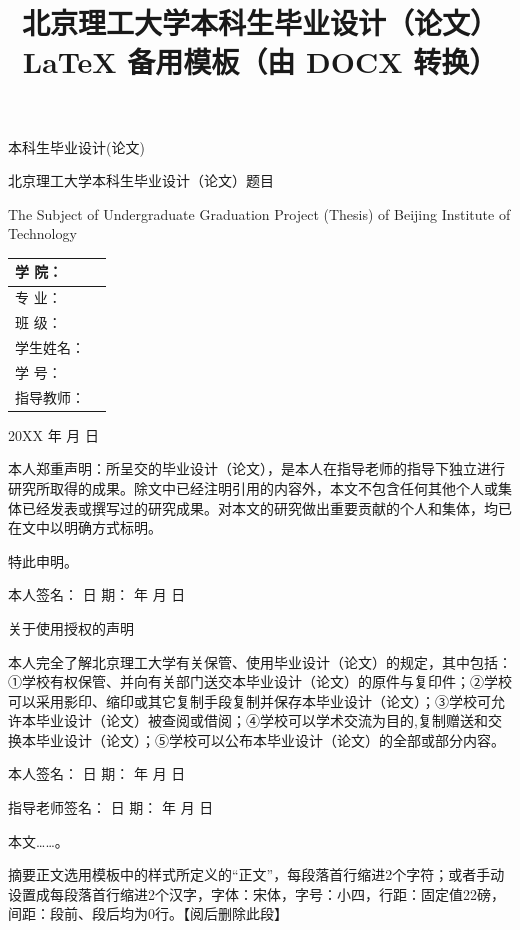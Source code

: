 \documentclass[UTF8,12pt,a4paper,fontset=fandol]{ctexbook}
\title{北京理工大学本科生毕业设计（论文）LaTeX 备用模板（由 DOCX 转换）}
\author{}
\date{}
\begin{document}
\maketitle
\tableofcontents
\clearpage


本科生毕业设计(论文)

北京理工大学本科生毕业设计（论文）题目

\begin{center}\small The Subject of Undergraduate Graduation Project (Thesis) of Beijing Institute of Technology\end{center}

\begin{longtable}{p{}p{}}
\toprule
学    院： &  \\
\midrule
专    业： &  \\
班    级： &  \\
学生姓名： &  \\
学    号： &  \\
指导教师： &  \\
\bottomrule
\end{longtable}

20XX 年   月   日

本人郑重声明：所呈交的毕业设计（论文），是本人在指导老师的指导下独立进行研究所取得的成果。除文中已经注明引用的内容外，本文不包含任何其他个人或集体已经发表或撰写过的研究成果。对本文的研究做出重要贡献的个人和集体，均已在文中以明确方式标明。

特此申明。

本人签名：               日 期：     年   月   日

关于使用授权的声明

本人完全了解北京理工大学有关保管、使用毕业设计（论文）的规定，其中包括：①学校有权保管、并向有关部门送交本毕业设计（论文）的原件与复印件；②学校可以采用影印、缩印或其它复制手段复制并保存本毕业设计（论文）；③学校可允许本毕业设计（论文）被查阅或借阅；④学校可以学术交流为目的,复制赠送和交换本毕业设计（论文）；⑤学校可以公布本毕业设计（论文）的全部或部分内容。

本人签名：               日 期：     年   月   日

指导老师签名：               日 期：     年   月   日

本文……。

摘要正文选用模板中的样式所定义的“正文”，每段落首行缩进2个字符；或者手动设置成每段落首行缩进2个汉字，字体：宋体，字号：小四，行距：固定值22磅，间距：段前、段后均为0行。【阅后删除此段】
\end{document}
